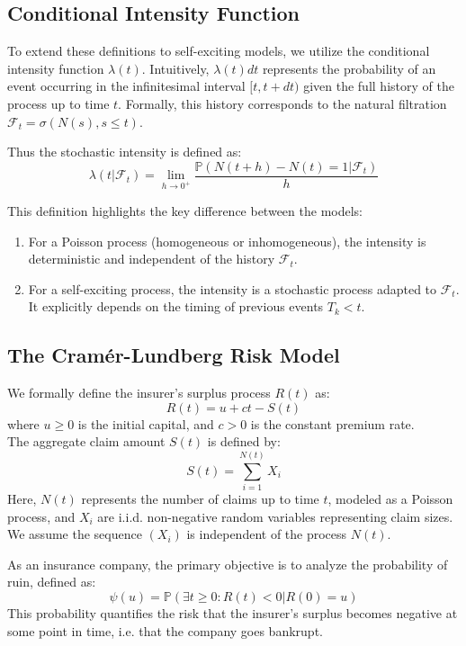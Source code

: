\documentclass[a4paper,11pt]{article}
\begin{document}
\subsection{Conditional Intensity Function}
To extend these definitions to self-exciting models, we utilize the conditional intensity function $\lambda(t)$. Intuitively, $\lambda(t)dt$ represents the probability of an event occurring in the infinitesimal interval $[t, t+dt)$ given the full history of the process up to time $t$. Formally, this history corresponds to the natural filtration $\mathcal{F}_t = \sigma(N(s), s \le t)$.

Thus the stochastic intensity is defined as:
\begin{equation}
    \lambda(t|\mathcal{F}_t) = \lim_{h \to 0^+} \frac{\mathbb{P}(N(t+h) - N(t) = 1 | \mathcal{F}_t)}{h}
\end{equation}

This definition highlights the key difference between the models:
\begin{enumerate}
    \item[(i)] For a Poisson process (homogeneous or inhomogeneous), the intensity is deterministic and independent of the history $\mathcal{F}_t$.
    \item[(ii)] For a self-exciting process, the intensity is a stochastic process adapted to $\mathcal{F}_t$. It explicitly depends on the timing of previous events $T_k < t$.
\end{enumerate}

\subsection{The Cramér-Lundberg Risk Model}
We formally define the insurer's surplus process $R(t)$ as:
\begin{equation}
    R(t) = u + ct - S(t)
\end{equation}
where $u \ge 0$ is the initial capital, and $c > 0$ is the constant premium rate.\\ The aggregate claim amount $S(t)$ is defined by:
\begin{equation}
    S(t) = \sum_{i=1}^{N(t)} X_i
\end{equation}
Here, $N(t)$ represents the number of claims up to time $t$, modeled as a Poisson process, and $X_i$ are i.i.d. non-negative random variables representing claim sizes. We assume the sequence $(X_i)$ is independent of the process $N(t)$.

As an insurance company, the primary objective is to analyze the probability of ruin, defined as:
\begin{equation}
    \psi(u) = \mathbb{P}(\exists t \ge 0 : R(t) < 0 | R(0) = u)
\end{equation}
This probability quantifies the risk that the insurer's surplus becomes negative at some point in time, i.e. that the company goes bankrupt.
\end{document}
